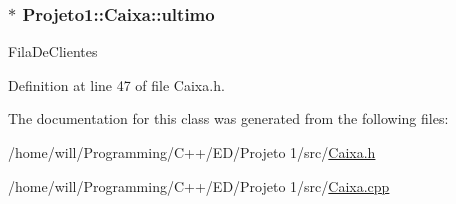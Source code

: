 \hypertarget{classProjeto1_1_1Caixa_adf2463f6ed9828bed7c3def83ab1fd95}{
\subsubsection[{ultimo}]{$\ast$ {\bf Projeto1::Caixa::ultimo}}}
\label{classProjeto1_1_1Caixa_adf2463f6ed9828bed7c3def83ab1fd95}
FilaDeClientes 

Definition at line 47 of file Caixa.h.



The documentation for this class was generated from the following files:\begin{DoxyCompactItemize}
\item 
/home/will/Programming/C++/ED/Projeto 1/src/\hyperlink{Caixa_8h}{Caixa.h}\item 
/home/will/Programming/C++/ED/Projeto 1/src/\hyperlink{Caixa_8cpp}{Caixa.cpp}\end{DoxyCompactItemize}
